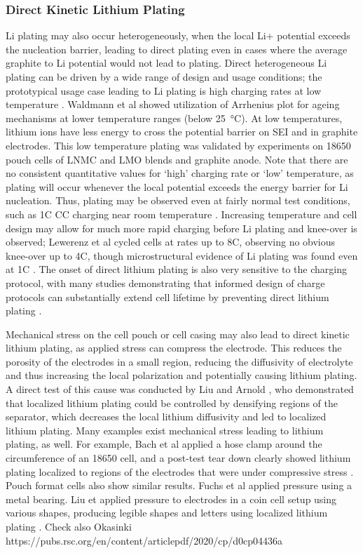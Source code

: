 \documentclass{article}
\begin{document}
\subsubsection{Direct Kinetic Lithium Plating}
Li plating may also occur heterogeneously, when the local Li+ potential exceeds the nucleation barrier, leading to direct plating even in cases where the average graphite to Li potential would not lead to plating. Direct heterogeneous Li plating can be driven by a wide range of design and usage conditions; the prototypical usage case leading to Li plating is high charging rates at low temperature \cite{waldmann_temperature_2014, petzl_lithium_2015}. Waldmann et al showed utilization of Arrhenius plot for ageing mechanisms at lower temperature ranges (below \SI{25}{\celsius}). At low temperatures, lithium ions have less energy to cross the potential barrier on SEI and in graphite electrodes. This low temperature plating was validated by experiments on 18650 pouch cells of LNMC and LMO blends and graphite anode. Note that there are no consistent quantitative values for ‘high’ charging rate or ‘low’ temperature, as plating will occur whenever the local potential exceeds the energy barrier for Li nucleation. Thus, plating may be observed even at fairly normal test conditions, such as 1C CC charging near room temperature \cite{waldmann_optimization_2015,burns_-situ_2015}. Increasing temperature and cell design may allow for much more rapid charging before Li plating and knee-over is observed; Lewerenz et al cycled cells at rates up to 8C, observing no obvious knee-over up to 4C, though microstructural evidence of Li plating was found even at 1C \cite{lewerenz_systematic_2017}. The onset of direct lithium plating is also very sensitive to the charging protocol, with many studies demonstrating that informed design of charge protocols can substantially extend cell lifetime by preventing direct lithium plating \cite{waldmann_optimization_2015,schindler_fast_2018}.

Mechanical stress on the cell pouch or cell casing may also lead to direct kinetic lithium plating, as applied stress can compress the electrode. This reduces the porosity of the electrodes in a small region, reducing the diffusivity of electrolyte and thus increasing the local polarization and potentially causing lithium plating. A direct test of this cause was conducted by Liu and Arnold \cite{liu_effects_2020}, who demonstrated that localized lithium plating could be controlled by densifying regions of the separator, which decreases the local lithium diffusivity and led to localized lithium plating. Many examples exist mechanical stress leading to lithium plating, as well. For example, Bach et al applied a hose clamp around the circumference of an 18650 cell, and a post-test tear down clearly showed lithium plating localized to regions of the electrodes that were under compressive stress \cite{bach_nonlinear_2016}. Pouch format cells also show similar results. Fuchs et al \cite{fuchs_post-mortem_2019} applied pressure using a metal bearing. Liu et applied pressure to electrodes in a coin cell setup using various shapes, producing legible shapes and letters using localized lithium plating \cite{liu_size_2018}.
Check also Okasinki https://pubs.rsc.org/en/content/articlepdf/2020/cp/d0cp04436a
\end{document}

